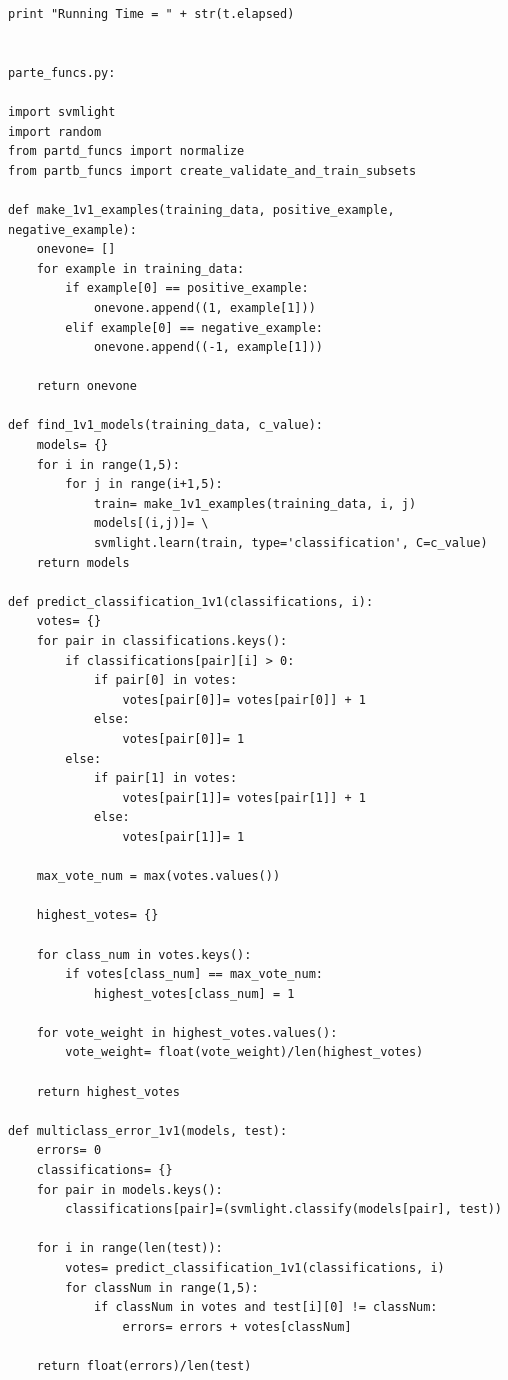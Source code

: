 \documentclass[12pt]{article}
\begin{document}
\begin{lstlisting}
print "Running Time = " + str(t.elapsed)


parte_funcs.py:

import svmlight
import random
from partd_funcs import normalize
from partb_funcs import create_validate_and_train_subsets

def make_1v1_examples(training_data, positive_example, negative_example):
    onevone= []
    for example in training_data:
        if example[0] == positive_example:
            onevone.append((1, example[1]))
        elif example[0] == negative_example:
            onevone.append((-1, example[1]))

    return onevone

def find_1v1_models(training_data, c_value):
    models= {}
    for i in range(1,5):
        for j in range(i+1,5):
            train= make_1v1_examples(training_data, i, j)
            models[(i,j)]= \
            svmlight.learn(train, type='classification', C=c_value)
    return models

def predict_classification_1v1(classifications, i):
    votes= {}
    for pair in classifications.keys():
        if classifications[pair][i] > 0:
            if pair[0] in votes:
                votes[pair[0]]= votes[pair[0]] + 1
            else:
                votes[pair[0]]= 1
        else:
            if pair[1] in votes:
                votes[pair[1]]= votes[pair[1]] + 1
            else:
                votes[pair[1]]= 1

    max_vote_num = max(votes.values())

    highest_votes= {}

    for class_num in votes.keys():
        if votes[class_num] == max_vote_num:
            highest_votes[class_num] = 1

    for vote_weight in highest_votes.values():
        vote_weight= float(vote_weight)/len(highest_votes)

    return highest_votes

def multiclass_error_1v1(models, test):
    errors= 0
    classifications= {}
    for pair in models.keys():
        classifications[pair]=(svmlight.classify(models[pair], test))

    for i in range(len(test)):
        votes= predict_classification_1v1(classifications, i)
        for classNum in range(1,5):
            if classNum in votes and test[i][0] != classNum:
                errors= errors + votes[classNum]

    return float(errors)/len(test)


\end{lstlisting}
\end{document}
